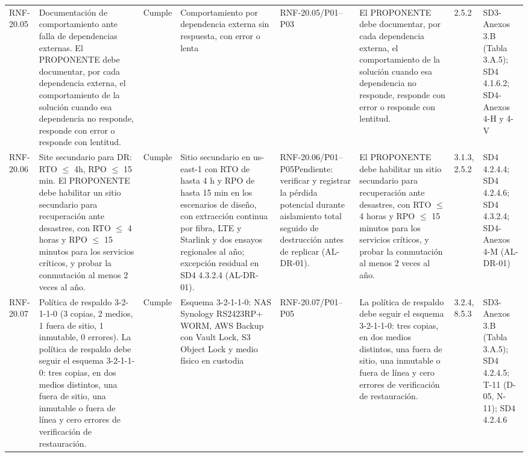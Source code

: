 \documentclass[oficio,firma,final]{lafrox}
\begin{document}
\begin{landscape}
{\begin{longtable}{@{}F{0.054} F{0.173} F{0.061} F{0.191} F{0.106} F{0.180} F{0.067} F{0.168}@{}}
  RNF-20.05 & Documentación de comportamiento ante falla de dependencias externas. El PROPONENTE debe documentar, por cada dependencia externa, el comportamiento de la solución cuando esa dependencia no responde, responde con error o responde con lentitud. & Cumple & Comportamiento por dependencia externa sin respuesta, con error o lenta & RNF-20.05/\allowbreak{}P01--\allowbreak{}P03 & El PROPONENTE debe documentar, por cada dependencia externa, el comportamiento de la solución cuando esa dependencia no responde, responde con error o responde con lentitud. & 2.5.2 & SD3-Anexos 3.B (Tabla 3.A.5); SD4 4.1.6.2; SD4-Anexos 4-H y 4-V  \\
  RNF-20.06 & Site secundario para DR: RTO $\leq$ 4h, RPO $\leq$ 15 min. El PROPONENTE debe habilitar un sitio secundario para recuperación ante desastres, con RTO $\leq$ 4 horas y RPO $\leq$ 15 minutos para los servicios críticos, y probar la conmutación al menos 2 veces al año. & Cumple & Sitio secundario en us-east-1 con RTO de hasta 4 h y RPO de hasta 15 min en los escenarios de diseño, con extracción continua por fibra, LTE y Starlink y dos ensayos regionales al año; excepción residual en SD4 4.3.2.4 (AL-DR-01). & RNF-20.06/\allowbreak{}P01--\allowbreak{}P05\newline Pendiente: verificar y registrar la pérdida potencial durante aislamiento total seguido de destrucción antes de replicar (AL-DR-01). & El PROPONENTE debe habilitar un sitio secundario para recuperación ante desastres, con RTO $\leq$ 4 horas y RPO $\leq$ 15 minutos para los servicios críticos, y probar la conmutación al menos 2 veces al año. & 3.1.3, 2.5.2 & SD4 4.2.4.4; SD4 4.2.4.6; SD4 4.3.2.4; SD4-Anexos 4-M (AL-DR-01) \\
  RNF-20.07 & Política de respaldo 3-2-1-1-0 (3 copias, 2 medios, 1 fuera de sitio, 1 inmutable, 0 errores). La política de respaldo debe seguir el esquema 3-2-1-1-0: tres copias, en dos medios distintos, una fuera de sitio, una inmutable o fuera de línea y cero errores de verificación de restauración. & Cumple & Esquema 3-2-1-1-0: NAS Synology RS2423RP+ WORM, AWS Backup con Vault Lock, S3 Object Lock y medio físico en custodia & RNF-20.07/\allowbreak{}P01--\allowbreak{}P05 & La política de respaldo debe seguir el esquema 3-2-1-1-0: tres copias, en dos medios distintos, una fuera de sitio, una inmutable o fuera de línea y cero errores de verificación de restauración. & 3.2.4, 8.5.3 & SD3-Anexos 3.B (Tabla 3.A.5); SD4 4.2.4.5; T-11 (D-05, N-11); SD4 4.2.4.6  \\

\end{longtable}}
\end{landscape}
\end{document}
